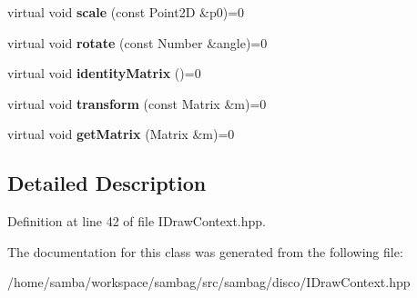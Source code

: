 \begin{DoxyCompactItemize}
\item 
\hypertarget{classsambag_1_1disco_1_1_i_draw_context_a73191666cb8d40d8c25db0a613237bb7}{
virtual void {\bfseries scale} (const Point2D \&p0)=0}
\label{classsambag_1_1disco_1_1_i_draw_context_a73191666cb8d40d8c25db0a613237bb7}

\item 
\hypertarget{classsambag_1_1disco_1_1_i_draw_context_aaa66abee764e1cf9a21ff99f4970242a}{
virtual void {\bfseries rotate} (const Number \&angle)=0}
\label{classsambag_1_1disco_1_1_i_draw_context_aaa66abee764e1cf9a21ff99f4970242a}

\item 
\hypertarget{classsambag_1_1disco_1_1_i_draw_context_af445ec1f242f091789865a59d7a36b11}{
virtual void {\bfseries identityMatrix} ()=0}
\label{classsambag_1_1disco_1_1_i_draw_context_af445ec1f242f091789865a59d7a36b11}

\item 
\hypertarget{classsambag_1_1disco_1_1_i_draw_context_acaee8e16ccdf7b29e287ba1e49391453}{
virtual void {\bfseries transform} (const Matrix \&m)=0}
\label{classsambag_1_1disco_1_1_i_draw_context_acaee8e16ccdf7b29e287ba1e49391453}

\item 
\hypertarget{classsambag_1_1disco_1_1_i_draw_context_a84c26f109b3ca41b6d5ae42ee6ea9427}{
virtual void {\bfseries getMatrix} (Matrix \&m)=0}
\label{classsambag_1_1disco_1_1_i_draw_context_a84c26f109b3ca41b6d5ae42ee6ea9427}

\end{DoxyCompactItemize}


\subsection{Detailed Description}


Definition at line 42 of file IDrawContext.hpp.



The documentation for this class was generated from the following file:\begin{DoxyCompactItemize}
\item 
/home/samba/workspace/sambag/src/sambag/disco/IDrawContext.hpp\end{DoxyCompactItemize}
